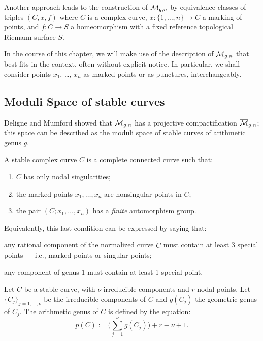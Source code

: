 Another approach leads to the construction of $\mathcal{M}_{g,n}$ by
equivalence classes of triples $(C, x, f)$ where $C$ is a complex
curve, $x: \{1, \ldots, n\} \longrightarrow C$ a marking of points,
and $f: C \to S$ a homeomorphism with a fixed reference topological
Riemann surface $S$.

In the course of this chapter, we will make use of the description of
$\mathcal{M}_{g,n}$ that best fits in the context, often without explicit
notice.  In particular, we shall consider points $x_1$, \ldots, $x_n$ as
marked points or as punctures, interchangeably.

\subsection{Moduli Space of stable curves}
\label{sec:moduli-space-stable}

Deligne and Mumford \cite{deligne-mumford} showed that $\mathcal{M}_{g,n}$ has
a projective compactification $\overline{\mathcal{M}}_{g,n}$; this space can be
described as the moduli space of stable curves of arithmetic genus
$g$.
\begin{definition}
  A stable complex curve $C$ is a complete connected curve such that:
  \begin{enumerate}
  \item $C$ has only nodal singularities;
  \item the marked points $x_1, \ldots, x_n$ are nonsingular points in
    $C$;
  \item the pair $(C; x_1, \ldots, x_n)$ has a \emph{finite} automorphism
    group.
  \end{enumerate}
\end{definition}
Equivalently, this last condition can be expressed by saying that:
\begin{inparaenum}[\slshape a)]
\item any rational component of the normalized curve $\tilde C$
  must contain at least 3 special points --- i.e., marked points or
  singular points;
\item  any component of genus $1$ must contain
  at least 1 special point.
\end{inparaenum}

Let $C$ be a stable curve, with $\nu$ irreducible components and $r$
nodal points. Let $\{C_j\}_{j=1, \dots, \nu}$ be the irreducible
components of $C$ and $g(C_j)$ the geometric genus of $C_j$.  The
arithmetic genus of $C$ is defined by the equation:
\begin{equation*}
  p(C) := \bigl({\textstyle \sum_{j=1}^\nu} g(C_j) \bigr) + r - \nu + 1.
\end{equation*}

